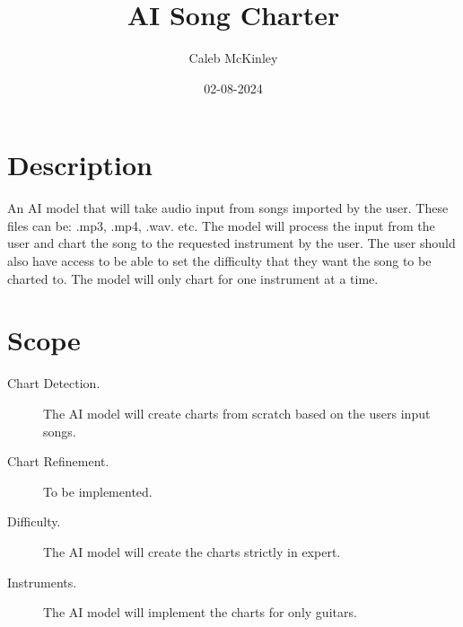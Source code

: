 \documentclass{article}
\begin{document}
\title{AI Song Charter}
\author{Caleb McKinley}
\date{02-08-2024}

\maketitle

\section*{Description}
    An AI model that will take audio input from songs imported by the user. These files can be: .mp3, .mp4, .wav. etc.
    The model will process the input from the user and chart the song to the requested instrument by the user. The user
    should also have access to be able to set the difficulty that they want the song to be charted to. The model will only
    chart for one instrument at a time.

\section*{Scope}

\begin{description}
    \item[Chart Detection.] The AI model will create charts from scratch based on the users input songs.
    \item[Chart Refinement.] To be implemented.
    \item[Difficulty.] The AI model will create the charts strictly in expert.
    \item[Instruments.] The AI model will implement the charts for only guitars.
\end{description}
\end{document}
